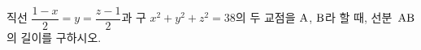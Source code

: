 직선 $\dfrac{1-x}{2}=y=\dfrac{z-1}{2}$과 구 $x^2+y^2+z^2=38$의 두 교점을 $\mathrm{A}$, $\mathrm{B}$라 할 때, 선분~$\mathrm{AB}$의 길이를 구하시오.
